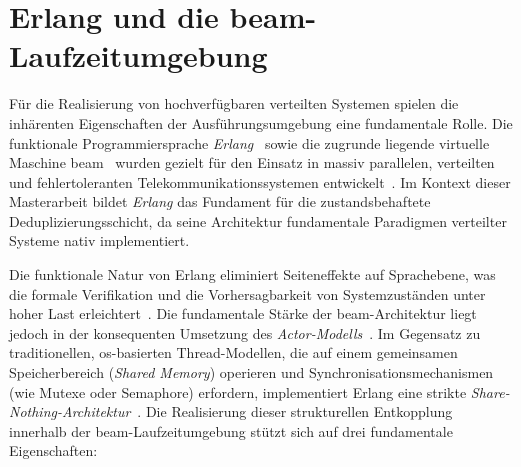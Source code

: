 \section{Erlang und die \acrshort{beam}-Laufzeitumgebung}
\label{sec:grundlagen_erlang}

Für die Realisierung von hochverfügbaren verteilten Systemen spielen die in\-hä\-ren\-ten Eigenschaften der Ausführungsumgebung eine fundamentale Rolle. Die funktionale Programmiersprache \textit{Erlang}~\citep{armstrong2003making} sowie die zugrunde liegende virtuelle Maschine \gls{beam}~\citep{stenman2015erlang, beam_vm} wurden gezielt für den Einsatz in massiv parallelen, verteilten und fehlertoleranten Telekommunikationssystemen entwickelt~\citep{armstrong2003making, virding1996concurrent}. Im Kontext dieser Masterarbeit bildet \textit{Erlang} das Fundament für die zustandsbehaftete Deduplizierungsschicht, da seine Architektur fundamentale Paradigmen verteilter Systeme nativ implementiert.

Die funktionale Natur von Erlang eliminiert Seiteneffekte auf Sprachebene, was die formale Verifikation und die Vorhersagbarkeit von Systemzuständen unter hoher Last erleichtert~\citep{armstrong2007programming}. Die fundamentale Stärke der \gls{beam}-Ar\-chi\-tek\-tur liegt jedoch in der konsequenten Umsetzung des \textit{Actor-Modells}~\citep{agha1986actors}. Im Gegensatz zu traditionellen, \gls{os}-basierten Thread-Modellen, die auf einem gemeinsamen Speicherbereich (\textit{Shared Memory}) operieren und Synchronisationsmechanismen (wie Mutexe oder Semaphore) erfordern, implementiert Erlang eine strikte \textit{Share-Nothing-Architektur}~\citep{armstrong2003making}. Die Realisierung dieser strukturellen Entkopplung innerhalb der \gls{beam}-Laufzeitumgebung stützt sich auf drei fundamentale Eigenschaften:

